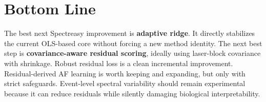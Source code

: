 \documentclass[11pt]{article}
\begin{document}
\section*{Bottom Line}

The best next Spectreasy improvement is \textbf{adaptive ridge}. It directly
stabilizes the current OLS-based core without forcing a new method identity. The
next best step is \textbf{covariance-aware residual scoring}, ideally using
laser-block covariance with shrinkage. Robust residual loss is a clean
incremental improvement. Residual-derived AF learning is worth keeping and
expanding, but only with strict safeguards. Event-level spectral variability
should remain experimental because it can reduce residuals while silently
damaging biological interpretability.
\end{document}
